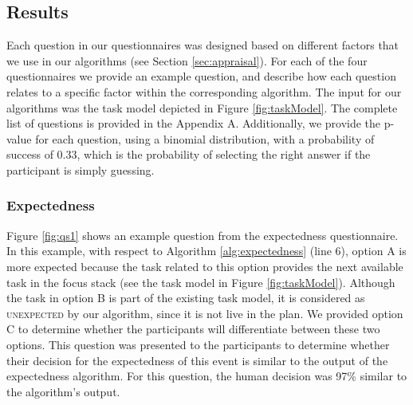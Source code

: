 \documentclass[12pt]{report}
\begin{document}
% 

\subsection{Results}
\label{sec:results-crowdsourcing}
Each question in our questionnaires was designed based on different factors that
we use in our algorithms (see Section \ref{sec:appraisal}).  For each of the
four questionnaires we provide an example question, and describe how each
question relates to a specific factor within the corresponding algorithm. The
input for our algorithms was the task model depicted in Figure
\ref{fig:taskModel}. The complete list of questions is provided in the Appendix
A. Additionally, we provide the p-value for each question, using a binomial
distribution, with a probability of success of 0.33, which is the probability of
selecting the right answer if the participant is simply guessing.

\subsubsection{Expectedness}
\label{sec:expectedness-crowdsourcing}
Figure \ref{fig:qs1} shows an example question from the expectedness
questionnaire. In this example, with respect to Algorithm \ref{alg:expectedness}
(line 6), option A is more expected because the task related to this option
provides the next available task in the focus stack (see the task model in
Figure \ref{fig:taskModel}). Although the task in option B is part of the
existing task model, it is considered as \textsc{unexpected} by our algorithm,
since it is not live in the plan. We provided option C to determine whether the
participants will differentiate between these two options. This question was
presented to the participants to determine whether their decision for the
expectedness of this event is similar to the output of the expectedness
algorithm. For this question, the human decision was 97\% similar to the
algorithm's output.
\end{document}
